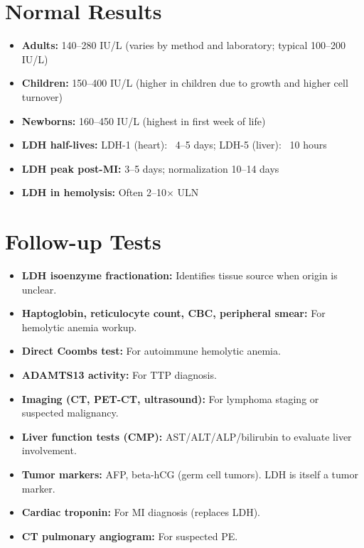 \section*{Normal Results}
\begin{itemize}
  \item \textbf{Adults:} 140--280 IU/L (varies by method and laboratory; typical 100--200 IU/L)
  \item \textbf{Children:} 150--400 IU/L (higher in children due to growth and higher cell turnover)
  \item \textbf{Newborns:} 160--450 IU/L (highest in first week of life)
  \item \textbf{LDH half-lives:} LDH-1 (heart): ~4--5 days; LDH-5 (liver): ~10 hours
  \item \textbf{LDH peak post-MI:} 3--5 days; normalization 10--14 days
  \item \textbf{LDH in hemolysis:} Often 2--10$\times$ ULN
\end{itemize}

\section*{Follow-up Tests}
\begin{itemize}
  \item \textbf{LDH isoenzyme fractionation:} Identifies tissue source when origin is unclear.
  \item \textbf{Haptoglobin, reticulocyte count, CBC, peripheral smear:} For hemolytic anemia workup.
  \item \textbf{Direct Coombs test:} For autoimmune hemolytic anemia.
  \item \textbf{ADAMTS13 activity:} For TTP diagnosis.
  \item \textbf{Imaging (CT, PET-CT, ultrasound):} For lymphoma staging or suspected malignancy.
  \item \textbf{Liver function tests (CMP):} AST/ALT/ALP/bilirubin to evaluate liver involvement.
  \item \textbf{Tumor markers:} AFP, beta-hCG (germ cell tumors). LDH is itself a tumor marker.
  \item \textbf{Cardiac troponin:} For MI diagnosis (replaces LDH).
  \item \textbf{CT pulmonary angiogram:} For suspected PE.
\end{itemize}


